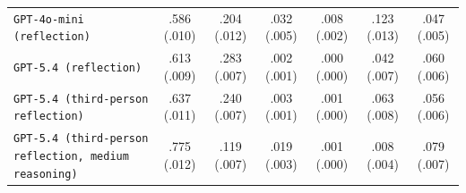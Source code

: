 \begin{tabular}{lcccccc}
		\texttt{GPT-4o-mini (reflection)} & .586 (.010) & .204 (.012) & .032 (.005) & .008 (.002) & .123 (.013) & .047 (.005) \\
		\texttt{GPT-5.4 (reflection)} & .613 (.009) & .283 (.007) & .002 (.001) & .000 (.000) & .042 (.007) & .060 (.006) \\
		\texttt{GPT-5.4 (third-person reflection)} & .637 (.011) & .240 (.007) & .003 (.001) & .001 (.000) & .063 (.008) & .056 (.006) \\
		\texttt{GPT-5.4 (third-person reflection, medium reasoning)} & .775 (.012) & .119 (.007) & .019 (.003) & .001 (.000) & .008 (.004) & .079 (.007) \\
		\hline
\end{tabular}
